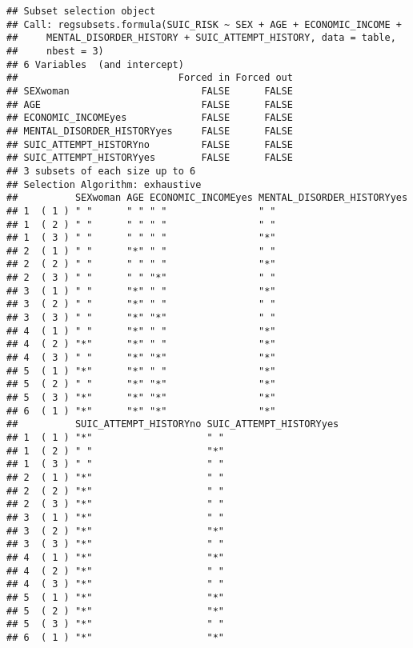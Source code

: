 \documentclass[
]{book}
\begin{document}
\begin{verbatim}
## Subset selection object
## Call: regsubsets.formula(SUIC_RISK ~ SEX + AGE + ECONOMIC_INCOME + 
##     MENTAL_DISORDER_HISTORY + SUIC_ATTEMPT_HISTORY, data = table, 
##     nbest = 3)
## 6 Variables  (and intercept)
##                            Forced in Forced out
## SEXwoman                       FALSE      FALSE
## AGE                            FALSE      FALSE
## ECONOMIC_INCOMEyes             FALSE      FALSE
## MENTAL_DISORDER_HISTORYyes     FALSE      FALSE
## SUIC_ATTEMPT_HISTORYno         FALSE      FALSE
## SUIC_ATTEMPT_HISTORYyes        FALSE      FALSE
## 3 subsets of each size up to 6
## Selection Algorithm: exhaustive
##          SEXwoman AGE ECONOMIC_INCOMEyes MENTAL_DISORDER_HISTORYyes
## 1  ( 1 ) " "      " " " "                " "                       
## 1  ( 2 ) " "      " " " "                " "                       
## 1  ( 3 ) " "      " " " "                "*"                       
## 2  ( 1 ) " "      "*" " "                " "                       
## 2  ( 2 ) " "      " " " "                "*"                       
## 2  ( 3 ) " "      " " "*"                " "                       
## 3  ( 1 ) " "      "*" " "                "*"                       
## 3  ( 2 ) " "      "*" " "                " "                       
## 3  ( 3 ) " "      "*" "*"                " "                       
## 4  ( 1 ) " "      "*" " "                "*"                       
## 4  ( 2 ) "*"      "*" " "                "*"                       
## 4  ( 3 ) " "      "*" "*"                "*"                       
## 5  ( 1 ) "*"      "*" " "                "*"                       
## 5  ( 2 ) " "      "*" "*"                "*"                       
## 5  ( 3 ) "*"      "*" "*"                "*"                       
## 6  ( 1 ) "*"      "*" "*"                "*"                       
##          SUIC_ATTEMPT_HISTORYno SUIC_ATTEMPT_HISTORYyes
## 1  ( 1 ) "*"                    " "                    
## 1  ( 2 ) " "                    "*"                    
## 1  ( 3 ) " "                    " "                    
## 2  ( 1 ) "*"                    " "                    
## 2  ( 2 ) "*"                    " "                    
## 2  ( 3 ) "*"                    " "                    
## 3  ( 1 ) "*"                    " "                    
## 3  ( 2 ) "*"                    "*"                    
## 3  ( 3 ) "*"                    " "                    
## 4  ( 1 ) "*"                    "*"                    
## 4  ( 2 ) "*"                    " "                    
## 4  ( 3 ) "*"                    " "                    
## 5  ( 1 ) "*"                    "*"                    
## 5  ( 2 ) "*"                    "*"                    
## 5  ( 3 ) "*"                    " "                    
## 6  ( 1 ) "*"                    "*"
\end{verbatim}
\end{document}

